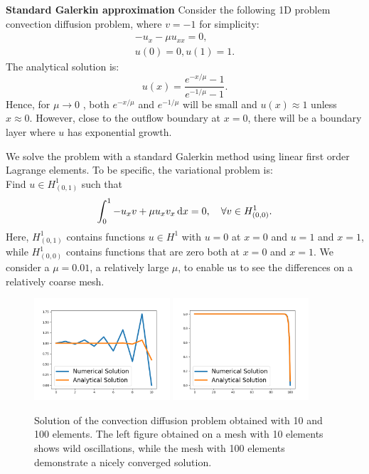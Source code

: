 \begin{example}{\textbf{Standard Galerkin approximation}} \label{ex1} 
Consider the following 1D problem convection diffusion problem, where $v=-1$ for simplicity: 
\begin{eqnarray}
-u_x - \mu u_{xx} = 0, \\ 
u(0) = 0, u(1) = 1 . 
\end{eqnarray}
The analytical solution is: 
\[
u(x) = \frac{e^{-x/\mu} - 1}{e^{-1/\mu} - 1}. 
\]
Hence, for $\mu \rightarrow 0$ , both $e^{-x/\mu}$ and $e^{-1/\mu}$ 
will be small and $u(x) \approx 1$ unless $x\approx 0$. However, close to the 
outflow boundary at $x=0$, there will be a boundary layer where $u$ has exponential growth. 

We solve the problem with a standard Galerkin method using linear first
order Lagrange elements. To be specific, the variational problem is: \\    
Find $u \in H^1_{(0,1)}$ such that 
\[
\int_0^1 -u_x v + \mu u_x v_x \, \mathrm{d}x   = 0, \quad \forall v \in H^1_{(0,0)} .  
\]
Here, $H^1_{(0,1)}$ contains functions $u\in H^1$ with $u=0$ at $x=0$ and $u=1$ and $x=1$, while
$H^1_{(0,0)}$ contains functions that are zero both at $x=0$ and $x=1$. We
consider a $\mu=0.01$, a relatively large $\mu$, to enable us to see the
differences on a relatively coarse mesh.     

\begin{figure}
\begin{center}
\includegraphics[width=0.45\textwidth]{chapters/conv-diff/plots/conv-diff.png}
\includegraphics[width=0.45\textwidth]{chapters/conv-diff/plots/conv-diff-hr.png}
\caption{Solution of the convection diffusion problem obtained with 10 and 100 elements. 
The left figure obtained on a mesh with 10 elements shows wild oscillations, while the 
mesh with 100 elements demonstrate a nicely converged solution.
}
\label{fig:conv1}
\end{center}
\end{figure}


\end{example}
